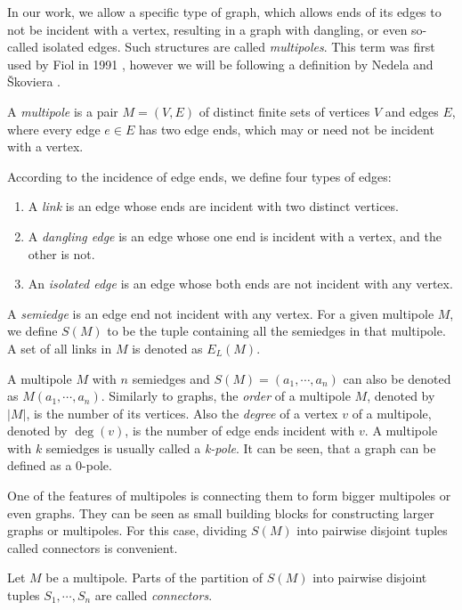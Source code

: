 \documentclass[12pt, twoside]{book}
\begin{document}
In our work, we allow a specific type of graph, which allows ends of its edges to not be incident with a vertex, resulting in a graph with dangling, or even so-called isolated edges. Such structures are called \textit{multipoles}. This term was first used by Fiol in 1991 \cite{Fiol1991}, however we will be following a definition by Nedela and Škoviera \cite{Nedela1996}.

\begin{definition}
	A \textit{multipole} is a pair $M=(V,E)$ of distinct finite sets of vertices $V$ and edges $E$, where every edge $e\in E$ has two edge ends, which may or need not be incident with a vertex.
	
	According to the incidence of edge ends, we define four types of edges:
	\begin{enumerate}[nolistsep]
		\item A \textit{link} is an edge whose ends are incident with two distinct vertices.
		\item A \textit{dangling edge} is an edge whose one end is incident with a vertex, and the other is not.
		\item An \textit{isolated edge} is an edge whose both ends are not incident with any vertex.
	\end{enumerate}
\end{definition}

A \textit{semiedge} is an edge end not incident with any vertex. For a given multipole $M$, we define $S(M)$ to be the tuple containing all the semiedges in that multipole. A set of all links in $M$ is denoted as $E_L(M)$.

A multipole $M$ with $n$ semiedges and $S(M) = (a_1, \cdots, a_n)$ can also be denoted as $M(a_1,\cdots,a_n)$. Similarly to graphs, the \textit{order} of a multipole $M$, denoted by $|M|$, is the number of its vertices. Also the \textit{degree} of a vertex $v$ of a multipole, denoted by $\deg(v)$, is the number of edge ends incident with $v$. A multipole with $k$ semiedges is usually called a \textit{k-pole}. It can be seen, that a graph can be defined as a 0-pole.

One of the features of multipoles is connecting them to form bigger multipoles or even graphs. They can be seen as small building blocks for constructing larger graphs or multipoles. For this case, dividing $S(M)$ into pairwise disjoint tuples called connectors is convenient.

\begin{definition}
	Let $M$ be a multipole. Parts of the partition of $S(M)$ into pairwise disjoint tuples $S_1,\cdots, S_n$ are called \textit{connectors}.
\end{definition}
\end{document}
